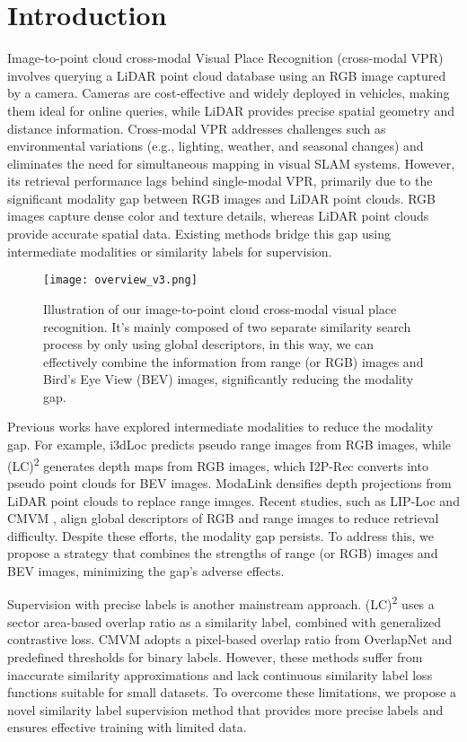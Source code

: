 \section{Introduction}
Image-to-point cloud cross-modal Visual Place Recognition (cross-modal VPR) involves querying a LiDAR point cloud database using an RGB image captured by a camera. Cameras are cost-effective and widely deployed in vehicles, making them ideal for online queries, while LiDAR provides precise spatial geometry and distance information. Cross-modal VPR addresses challenges such as environmental variations (e.g., lighting, weather, and seasonal changes) and eliminates the need for simultaneous mapping in visual SLAM systems. However, its retrieval performance lags behind single-modal VPR, primarily due to the significant modality gap between RGB images and LiDAR point clouds. RGB images capture dense color and texture details, whereas LiDAR point clouds provide accurate spatial data. Existing methods bridge this gap using intermediate modalities or similarity labels for supervision.

\begin{figure}[]
    \centering
    \texttt{[image: overview\_v3.png]}
    \caption{Illustration of our image-to-point cloud cross-modal visual place recognition. It's mainly composed of two separate similarity search process by only using global descriptors, in this way, we can effectively combine the information from range (or RGB) images and Bird's Eye View (BEV) images, significantly reducing the modality gap.}
    \label{fig:overview}
\end{figure}

Previous works have explored intermediate modalities to reduce the modality gap. For example, i3dLoc \cite{yin2021i3dloc} predicts pseudo range images from RGB images, while (LC)\textsuperscript{2} \cite{lee20232} generates depth maps from RGB images, which I2P-Rec \cite{zheng2023i2p} converts into pseudo point clouds for BEV images. ModaLink \cite{xie2024modalink} densifies depth projections from LiDAR point clouds to replace range images. Recent studies, such as LIP-Loc \cite{shubodh2024lip} and CMVM \cite{yao2024monocular}, align global descriptors of RGB and range images to reduce retrieval difficulty. Despite these efforts, the modality gap persists. To address this, we propose a strategy that combines the strengths of range (or RGB) images and BEV images, minimizing the gap's adverse effects.

Supervision with precise labels is another mainstream approach. (LC)\textsuperscript{2} \cite{lee20232} uses a sector area-based overlap ratio as a similarity label, combined with generalized contrastive loss. CMVM \cite{yao2024monocular} adopts a pixel-based overlap ratio from OverlapNet \cite{chen2021overlapnet} and predefined thresholds for binary labels. However, these methods suffer from inaccurate similarity approximations and lack continuous similarity label loss functions suitable for small datasets. To overcome these limitations, we propose a novel similarity label supervision method that provides more precise labels and ensures effective training with limited data.

